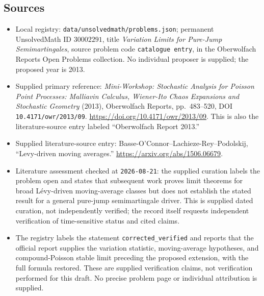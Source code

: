 \documentclass[11pt]{article}
\begin{document}
\subsection{Sources}
\begin{itemize}
\item Local registry: \texttt{data/unsolvedmath/problems.json}; permanent UnsolvedMath ID \(30002291\), title \emph{Variation Limits for Pure-Jump Semimartingales}, source problem code \texttt{catalogue entry}, in the Oberwolfach Reports Open Problems collection. No individual proposer is supplied; the proposed year is 2013.
\item Supplied primary reference: \emph{Mini-Workshop: Stochastic Analysis for Poisson Point Processes: Malliavin Calculus, Wiener-Ito Chaos Expansions and Stochastic Geometry} (2013), Oberwolfach Reports, pp.\ 483--520, DOI \texttt{10.4171/owr/2013/09}. \url{https://doi.org/10.4171/owr/2013/09}. This is also the literature-source entry labeled ``Oberwolfach Report 2013.''
\item Supplied literature-source entry: Basse-O'Connor--Lachieze-Rey--Podolskij, ``Levy-driven moving averages.'' \url{https://arxiv.org/abs/1506.06679}.
\item Literature assessment checked at \texttt{2026-08-21}: the supplied curation labels the problem open and states that subsequent work proves limit theorems for broad L\'evy-driven moving-average classes but does not establish the stated result for a general pure-jump semimartingale driver. This is supplied dated curation, not independently verified; the record itself requests independent verification of time-sensitive status and cited claims.
\item The registry labels the statement \texttt{corrected\_verified} and reports that the official report supplies the variation statistic, moving-average hypotheses, and compound-Poisson stable limit preceding the proposed extension, with the full formula restored. These are supplied verification claims, not verification performed for this draft. No precise problem page or individual attribution is supplied.
\end{itemize}
\end{document}
